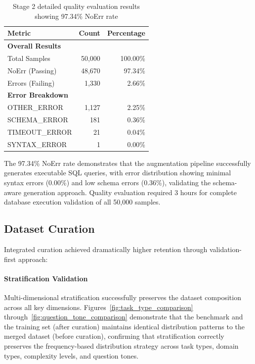 \begin{table}%
\centering
\small
\begin{tabular}{lrr}
\toprule
\textbf{Metric} & \textbf{Count} & \textbf{Percentage} \\
\midrule
\multicolumn{3}{l}{\textbf{Overall Results}} \\
Total Samples & 50,000 & 100.00\% \\
NoErr (Passing) & 48,670 & 97.34\% \\
Errors (Failing) & 1,330 & 2.66\% \\
\midrule
\multicolumn{3}{l}{\textbf{Error Breakdown}} \\
OTHER\_ERROR & 1,127 & 2.25\% \\
SCHEMA\_ERROR & 181 & 0.36\% \\
TIMEOUT\_ERROR & 21 & 0.04\% \\
SYNTAX\_ERROR & 1 & 0.00\% \\
\bottomrule
\end{tabular}
\caption{Stage 2 detailed quality evaluation results showing 97.34\% NoErr rate}
\end{table}

The 97.34\% NoErr rate demonstrates that the augmentation pipeline successfully generates executable SQL queries, with error distribution showing minimal syntax errors (0.00\%) and low schema errors (0.36\%), validating the schema-aware generation approach. Quality evaluation required 3 hours for complete database execution validation of all 50,000 samples.

\subsection{Dataset Curation}

Integrated curation achieved dramatically higher retention through validation-first approach:



\paragraph{Stratification Validation}

Multi-dimensional stratification successfully preserves the dataset composition across all key dimensions. Figures~\ref{fig:task_type_comparison} through~\ref{fig:question_tone_comparison} demonstrate that the benchmark and the training set (after curation) maintains identical distribution patterns to the merged dataset (before curation), confirming that stratification correctly preserves the frequency-based distribution strategy across task types, domain types, complexity levels, and question tones.

